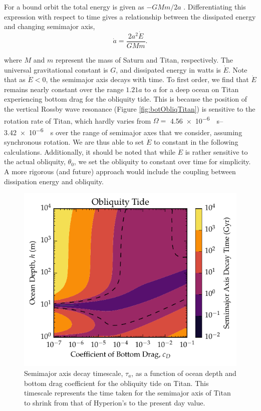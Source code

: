 For a bound orbit the total energy is given as $-GMm/2a$ \citep{goldreich1966q}. Differentiating this expression with respect to time gives a relationship between the dissipated energy and changing semimajor axis,
\begin{equation}
\dot{a} = \dfrac{2a^2 \dot{E}}{GM m}.
\label{eq:adot}
\end{equation}

where $M$ and $m$ represent the mass of Saturn and Titan, respectively. The universal gravitational constant is $G$, and dissipated energy in watts is $\dot{E}$. Note that as $\dot{E} < 0$, the semimajor axis decays with time. To first order, we find that $\dot{E}$ remains nearly constant over the range $1.21 a$ to $a$ for a deep ocean on Titan experiencing bottom drag for the obliquity tide. This is because the position of the vertical Rossby wave resonance (Figure \ref{fig:botObliqTitan}) is sensitive to the rotation rate of Titan, which hardly varies from $\Omega =$ \SIrange{4.56e-6}{3.42e-6}{\per\second} over the range of semimajor axes that we consider, assuming synchronous rotation. We are thus able to set $\dot{E}$ to constant in the following calculations. Additionally, it should be noted that while $\dot{E}$ is rather sensitive to the actual obliquity, $\theta_0$, we set the obliquity to constant over time for simplicity. A more rigorous (and future) approach would include the coupling between dissipation energy and obliquity.

\begin{figure}[!b]
\centering
\includegraphics[width=\linewidth]{Figures/titan_timescale}
\caption{Semimajor axis decay timescale, $\tau_a$, as a function of ocean depth and bottom drag coefficient for the obliquity tide on Titan. This timescale represents the time taken for the semimajor axis of Titan to shrink from that of Hyperion's to the present day value. \label{fig:a_evo}}
\end{figure}

